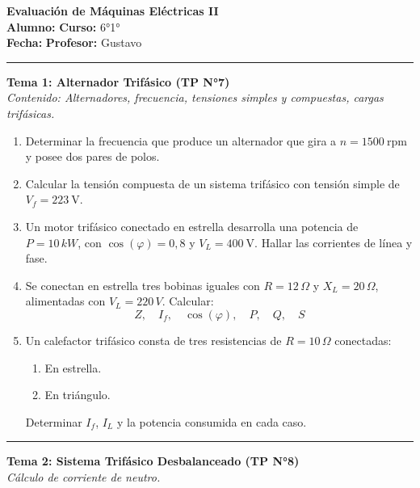 \documentclass[12pt,a4paper]{article}
\begin{document}
\begin{center}
{\Large \textbf{Evaluación de Máquinas Eléctricas II}}\\[1em]
\textbf{Alumno:} \underline{\hspace{7cm}} \hfill \textbf{Curso:} 6°1° \\[0.5em]
\textbf{Fecha:} \underline{\hspace{4cm}} \hfill \textbf{Profesor:} Gustavo \\[1em]
\hrule
\end{center}

\vspace{1em}

\begin{center}
{\Large \textbf{Tema 1: Alternador Trifásico (TP N°7)}}\\[0.5em]
\textit{Contenido: Alternadores, frecuencia, tensiones simples y compuestas, cargas trifásicas.}
\end{center}

\begin{enumerate}
\item Determinar la frecuencia que produce un alternador que gira a \( n = 1500\ \text{rpm} \) y posee dos pares de polos.
\item Calcular la tensión compuesta de un sistema trifásico con tensión simple de \( V_f = 223\ \text{V} \).
\item Un motor trifásico conectado en estrella desarrolla una potencia de \( P = 10\,kW \), con \( \cos(\varphi) = 0{,}8 \) y \( V_L = 400\ \text{V} \). Hallar las corrientes de línea y fase.
\item Se conectan en estrella tres bobinas iguales con \( R = 12\,\Omega \) y \( X_L = 20\,\Omega \), alimentadas con \( V_L = 220\,V \). Calcular:
\[
Z,\quad I_f,\quad \cos(\varphi),\quad P,\quad Q,\quad S
\]
\item Un calefactor trifásico consta de tres resistencias de \( R = 10\,\Omega \) conectadas:
\begin{enumerate}
  \item En estrella.
  \item En triángulo.
\end{enumerate}
Determinar \( I_f \), \( I_L \) y la potencia consumida en cada caso.
\end{enumerate}

\vspace{1em}
\hrule
\vspace{1em}

\begin{center}
{\Large \textbf{Tema 2: Sistema Trifásico Desbalanceado (TP N°8)}}\\[0.5em]
\textit{Cálculo de corriente de neutro.}
\end{center}
\end{document}
